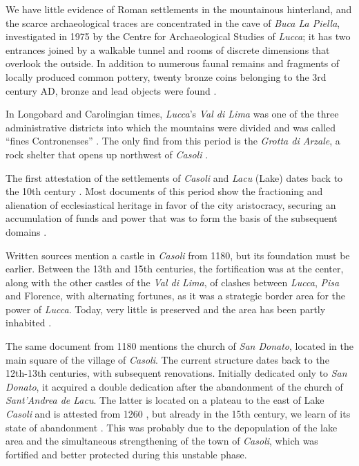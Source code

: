 \documentclass[sustainability,article,submit,pdftex,moreauthors]{Definitions/mdpi}
\begin{document}
We have little evidence of Roman settlements in the mountainous hinterland, and the scarce archaeological traces are concentrated in the cave of \textit{Buca La Piella}, investigated in 1975 by the Centre for Archaeological Studies of \emph{Lucca}; it has two entrances joined by a walkable tunnel and rooms of discrete dimensions that overlook the outside. In addition to numerous faunal remains and fragments of locally produced common pottery, twenty bronze coins belonging to the 3rd century AD, bronze and lead objects were found \cite{gia96, men81, cia03}. 

In Longobard and Carolingian times, \emph{Lucca}'s \emph{Val di Lima} was one of the three administrative districts into which the mountains were divided and was called “fines Contronenses” \cite{qui02, cia06, cia11}. The only find from this period is the \textit{Grotta di Arzale}, a rock shelter that opens up northwest of \emph{Casoli} \cite{gia96}.

The first attestation of the settlements of \emph{Casoli} and \emph{Lacu} (Lake) dates back to the 10th century \cite{gia96}. Most documents of this period show the fractioning and alienation of ecclesiastical heritage in favor of the city aristocracy, securing an accumulation of funds and power that was to form the basis of the subsequent domains \cite{qui02, gia96, for12, for15}.

Written sources mention a castle in \emph{Casoli} from 1180, but its foundation must be earlier. Between the 13th and 15th centuries, the fortification was at the center, along with the other castles of the \emph{Val di Lima}, of clashes between \emph{Lucca}, \textit{Pisa} and Florence, with alternating fortunes, as it was a strategic border area for the power of \emph{Lucca}. Today, very little is preserved and the area has been partly inhabited \cite{gia96, for12, rom16}.

The same document from 1180 mentions the church of \textit{San Donato}, located in the main square of the village of \emph{Casoli}. The current structure dates back to the 12th-13th centuries, with subsequent renovations. Initially dedicated only to \textit{San Donato}, it acquired a double dedication after the abandonment of the church of \textit{Sant'Andrea de Lacu}. The latter is located on a plateau to the east of Lake \emph{Casoli} and is attested from 1260 \cite{ber18, gia96, cap17}, but already in the 15th century, we learn of its state of abandonment \cite{gia96, con12}. This was probably due to the depopulation of the lake area and the simultaneous strengthening of the town of \emph{Casoli}, which was fortified and better protected during this unstable phase.
\end{document}
